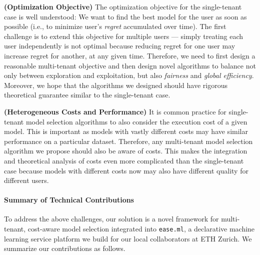\documentclass[letterpaper]{vldb}
\newcommand{\eml}{\texttt{ease.ml}\xspace}
\begin{document}
\noindent
{\bf (Optimization Objective)} The optimization objective for the single-tenant case is well understood: We want to find the best model for the user as soon as possible (i.e., to minimize
  user's {\em regret} accumulated over time).
  The first challenge is to extend this objective for
  multiple users --- simply treating each user 
  independently is not optimal because reducing regret for one user may increase regret for another, at any given time. 
  Therefore, we need to first design a reasonable
  multi-tenant objective and then design novel
  algorithms to balance not only between
  exploration and exploitation, but also
  {\em fairness} and {\em global efficiency}. Moreover,
  we hope that the algorithms we designed should have rigorous
  theoretical guarantee similar to the single-tenant case.
  
\noindent
{\bf (Heterogeneous Costs and Performance)} It is
  common practice for single-tenant model selection
  algorithms to also consider the execution cost of
  a given model. This is important as models with
  vastly different costs may have similar performance 
  on a particular dataset. Therefore, any multi-tenant
  model selection algorithm we propose should also
  be aware of costs. This makes the integration and
  theoretical analysis of costs even more complicated
  than the single-tenant case because models with 
  different costs now may also have different quality for 
  different users. 
  




\vspace{-1em}
\paragraph*{Summary of Technical Contributions}
To address the above challenges, our solution is a novel
framework for multi-tenant, cost-aware model selection
integrated into \eml, a declarative machine learning
service platform we build for our local collaborators
at ETH Zurich.
We summarize our contributions as follows.
\end{document}
